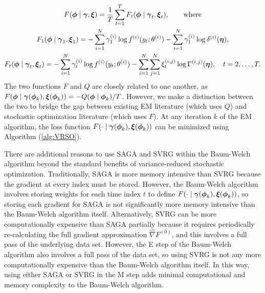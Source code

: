 \begin{gather}
    F(\boldsymbol{\phi} \mid \boldsymbol{\gamma}, \boldsymbol{\xi}) = \frac{1}{T}\sum_{t=1}^T F_t(\boldsymbol{\phi} \mid \boldsymbol{\gamma}_t , \boldsymbol{\xi}_t), \qquad \text{where} \\
    F_1(\boldsymbol{\phi} \mid \boldsymbol{\gamma}_1,\boldsymbol{\xi}_1) = - \sum_{i=1}^N \gamma^{(i)}_1 \log f^{(i)}(y_t;\theta^{(i)}) - \sum_{i=1}^N \gamma^{(i)}_1 \log \delta^{(i)}(\boldsymbol{\eta}), \\
    F_t(\boldsymbol{\phi} \mid \boldsymbol{\gamma}_t , \boldsymbol{\xi}_t) = - \sum_{i=1}^N \gamma^{(i)}_t \log f^{(i)}(y_t;\theta^{(i)}) - \sum_{i=1}^N \sum_{j=1}^N \xi^{(i,j)}_t \log \Gamma^{(i,j)}(\boldsymbol{\eta}), \quad t = 2, \ldots, T.
\end{gather}
%
%
The two functions $F$ and $Q$ are closely related to one another, as $F(\boldsymbol{\phi} \mid \boldsymbol{\gamma}(\boldsymbol{\phi}_k), \boldsymbol{\xi}(\boldsymbol{\phi}_k)) = - Q(\boldsymbol{\phi} \mid \boldsymbol{\phi}_k) / T$. However, we make a distinction between the two to bridge the gap between existing EM literature (which uses $Q$) and stochastic optimization literature (which uses $F$). At any iteration $k$ of the EM algorithm, the loss function $F(\cdot \mid \boldsymbol{\gamma}(\boldsymbol{\phi}_k),\boldsymbol{\xi}(\boldsymbol{\phi}_k))$ can be minimized using Algorithm (\ref{alg:VRSO}). %

There are additional reasons to use SAGA and SVRG within the Baum-Welch algorithm beyond the standard benefits of variance-reduced stochastic optimization. Traditionally, SAGA is more memory intensive than SVRG because the gradient at every index must be stored. However, the Baum-Welch algorithm involves storing weights for each time index $t$ to define $F(\cdot \mid \boldsymbol{\gamma}(\boldsymbol{\phi}_k), \boldsymbol{\xi}(\boldsymbol{\phi}_k))$, so storing each gradient for SAGA is not significantly more memory intensive than the Baum-Welch algorithm itself. Alternatively, SVRG can be more computationally expensive than SAGA partially because it requires periodically re-calculating the full gradient approximation $\widehat \nabla F^{(0)}$, and this involves a full pass of the underlying data set. However, the E step of the Baum-Welch algorithm also involves a full pass of the data set, so using SVRG is not any more computationally expensive than the Baum-Welch algorithm itself. In this way, using either SAGA or SVRG in the M step adds minimal computational and memory complexity to the Baum-Welch algorithm.

